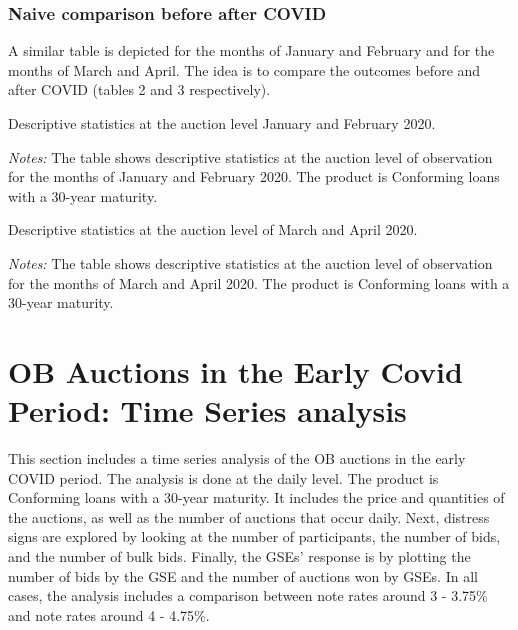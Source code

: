 \documentclass[11pt,a4paper]{article}
\begin{document}
\subsubsection{Naive comparison before after COVID}

A similar table is depicted for the months of January and February and for the months of March and April. The idea is to compare the outcomes before and after COVID (tables 2 and 3 respectively).

\begin{table}
  \centering
  
  \caption{Descriptive statistics at the auction level January and February 2020. }
  \begin{minipage}{\textwidth}
      \footnotesize{\textit{Notes:} The table shows descriptive statistics at the auction level of observation for the months of January and  February 2020. The product is Conforming loans with a 30-year maturity. } 
      \end{minipage}
\end{table}

\begin{table}
  \centering
  
  \caption{Descriptive statistics at the auction level of March and April 2020. }
  \begin{minipage}{\textwidth}
      \footnotesize{\textit{Notes:} The table shows descriptive statistics at the auction level of observation for the months of March and April 2020. The product is Conforming loans with a 30-year maturity. } 
      \end{minipage}
\end{table}

\pagebreak
\section{OB Auctions in the Early Covid Period: Time Series analysis}

This section includes a time series analysis of the OB auctions in the early COVID period. The analysis is done at the daily level. The product is Conforming loans with a 30-year maturity. It includes the price and quantities of the auctions, as well as the number of auctions that occur daily. Next, distress signs are explored by looking at the number of participants, the number of bids, and the number of bulk bids. Finally, the GSEs' response is by plotting the number of bids by the GSE and the number of auctions won by GSEs.
In all cases, the analysis includes a comparison between note rates around 3 - 3.75\% and note rates around 4 - 4.75\%.
\end{document}
